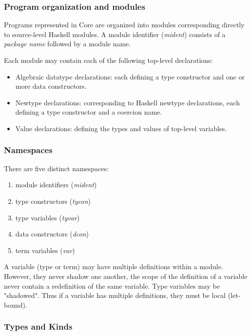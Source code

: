 \subsubsection{Program organization and modules}

Programs represented in Core are organized into modules corresponding directly to source-level
Haskell modules. A module identifier (\emph{mident}) consists of a \emph{package name} followed
by a module name. 

Each module may contain each of the following top-level declarations:
\begin{itemize}
\item{Algebraic datatype declarations:} each defining a type constructor and one or more data
constructors.
\item{Newtype declarations:} corresponding to Haskell newtype declarations, each defining a 
type constructor and a coercion name.
\item{Value declarations:} defining the types and values of top-level variables.
\end{itemize}


\cite{tolmach2010ghc}


\subsubsection{Namespaces}

There are five distinct namespaces:
\begin{enumerate}

\item module identifiers (\emph{mident})
\item type constructors (\emph{tycon})
\item type variables (\emph{tyvar})
\item data constructors (\emph{dcon})
\item term variables (\emph{var})
\end{enumerate}

A variable (type or term) may have multiple definitions within a module. However, they
never shadow one another, the scope of the definition of a variable never contain a
redefinition of the same variable. Type variables may be "shadowed". Thus if a variable has
multiple definitions, they must be local (let-bound).\cite{tolmach2010ghc}

\subsubsection{Types and Kinds}

